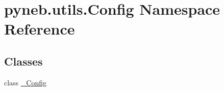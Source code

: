 \hypertarget{namespacepyneb_1_1utils_1_1_config}{\section{pyneb.\-utils.\-Config Namespace Reference}
\label{namespacepyneb_1_1utils_1_1_config}
}
\subsection*{Classes}
\begin{DoxyCompactItemize}
\item 
class \hyperlink{classpyneb_1_1utils_1_1_config_1_1___config}{\-\_\-\-Config}
\end{DoxyCompactItemize}
